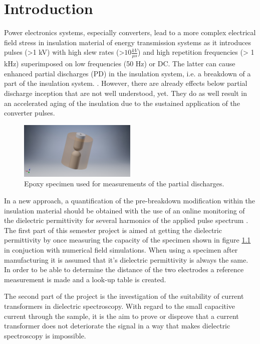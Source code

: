 
\chapter{Introduction}
Power electronics systems, especially converters, lead to a more complex electrical field stress in insulation material of energy transmission systems as it introduces pulses (>1 kV) with high slew rates (>$10 \frac{kV}{\mu s}$) and high repetition frequencies (> 1 kHz) superimposed on low frequencies (50 Hz) or DC. The latter can cause enhanced partial discharges (PD) in the insulation system, i.e. a breakdown of a part of the insulation system. \cite{TransformerEngineering}. However, there are already effects below partial discharge inception that are not well understood, yet. They do as well result in an accelerated aging of the insulation due to the sustained application of the converter pulses. 
\newline


\begin{figure}[!ht]
  
  
  \centerline{\includegraphics[width=0.5\textwidth]{figures/intro/epoxy_specimen.jpg}}
\caption{Epoxy specimen used for measurements of the partial discharges. \protect\footnotemark}
	\label{fig.specimen}
\end{figure}

In a new approach, a quantification of the pre-breakdown modification within the insulation material should be obtained with the use of an online monitoring of the dielectric permittivity for several harmonics of the applied pulse spectrum \cite{FaerberMVISS}.
The first part of this semester project is aimed at getting the dielectric permittivity by once measuring the capacity of the specimen shown in figure \ref{fig.specimen} in conjuction with numerical field simulations. When using a specimen after manufacturing it is assumed that it's dielectric permittivity is always the same. In order to be able to determine the distance of the two electrodes a reference measurement is made and a look-up table is created. 

The second part of the project is the investigation of the suitability of current transformers in dielectric spectroscopy. With regard to the small capacitive current through the sample, it is the aim to prove or disprove that a current transformer does not deteriorate the signal in a way that makes dielectric spectroscopy is impossible. 

